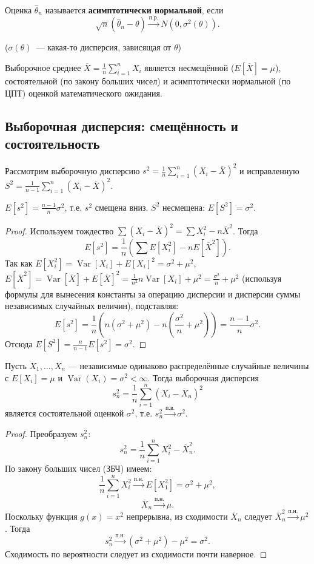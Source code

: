 \documentclass[10pt]{article}
\begin{document}
\begin{definition}
Оценка $\hat{\theta}_n$ называется \textbf{асимптотически нормальной}, если
\[
\sqrt{n}(\hat{\theta}_n - \theta) \xrightarrow{\text{п.р.}} N(0, \sigma^2(\theta)).
\]

($\sigma(\theta)$~--- какая-то дисперсия, зависящая от $\theta$)
\end{definition}

\begin{example}
Выборочное среднее $\overline{X} = \frac{1}{n}\sum_{i=1}^n X_i$ является несмещённой ($E[\overline{X}]=\mu$), состоятельной (по закону больших чисел) и асимптотически нормальной (по ЦПТ) оценкой математического ожидания.
\end{example}

\subsection{Выборочная дисперсия: смещённость и состоятельность}
Рассмотрим выборочную дисперсию $s^2 = \frac{1}{n}\sum_{i=1}^n (X_i - \overline{X})^2$ и исправленную $S^2 = \frac{1}{n-1}\sum_{i=1}^n (X_i - \overline{X})^2$.

\begin{theorem}
$E[s^2] = \frac{n-1}{n}\sigma^2$, т.е. $s^2$ смещена вниз. $S^2$ несмещена: $E[S^2] = \sigma^2$.
\end{theorem}
\begin{proof}
Используем тождество $\sum (X_i - \overline{X})^2 = \sum X_i^2 - n\overline{X}^2$. Тогда
\[
E[s^2] = \frac{1}{n}\left( \sum E[X_i^2] - n E[\overline{X}^2] \right).
\]
Так как $E[X_i^2] = \operatorname{Var}[X_i] + E[X_i]^2 = \sigma^2 + \mu^2$, $E[\overline{X}^2] = \operatorname{Var}[\overline{X}] + E[\overline{X}]^2 = \frac{1}{n^2} n \operatorname{Var}[X_i] + \mu^2 = \frac{\sigma^2}{n} + \mu^2$ (используя формулы для вынесения константы за операцию дисперсии и дисперсии суммы независимых случайных величин), подставляя:
\[
E[s^2] = \frac{1}{n}\left( n(\sigma^2+\mu^2) - n\left(\frac{\sigma^2}{n}+\mu^2\right) \right) = \frac{n-1}{n}\sigma^2.
\]
Отсюда $E[S^2] = \frac{n}{n-1}E[s^2] = \sigma^2$.
\end{proof}

\begin{theorem}
Пусть $X_1,\dots,X_n$ — независимые одинаково распределённые случайные величины с $E[X_i]=\mu$ и $\operatorname{Var}(X_i)=\sigma^2 < \infty$. Тогда выборочная дисперсия
\[
s_n^2 = \frac{1}{n}\sum_{i=1}^n (X_i - \overline{X}_n)^2
\]
является состоятельной оценкой $\sigma^2$, т.е. $s_n^2 \xrightarrow{\text{п.в.}} \sigma^2$.
\end{theorem}
\begin{proof}
Преобразуем $s_n^2$:
\[
s_n^2 = \frac{1}{n}\sum_{i=1}^n X_i^2 - \overline{X}_n^2.
\]
По закону больших чисел (ЗБЧ) имеем:
\[
\frac{1}{n}\sum_{i=1}^n X_i^2 \xrightarrow{\text{п.н.}} E[X_1^2] = \sigma^2 + \mu^2,
\]
\[
\overline{X}_n \xrightarrow{\text{п.н.}} \mu.
\]
Поскольку функция $g(x)=x^2$ непрерывна, из сходимости $\overline{X}_n$ следует $\overline{X}_n^2 \xrightarrow{\text{п.н.}} \mu^2$. Тогда
\[
s_n^2 \xrightarrow{\text{п.н.}} (\sigma^2 + \mu^2) - \mu^2 = \sigma^2.
\]
Сходимость по вероятности следует из сходимости почти наверное.
\end{proof}
\end{document}
